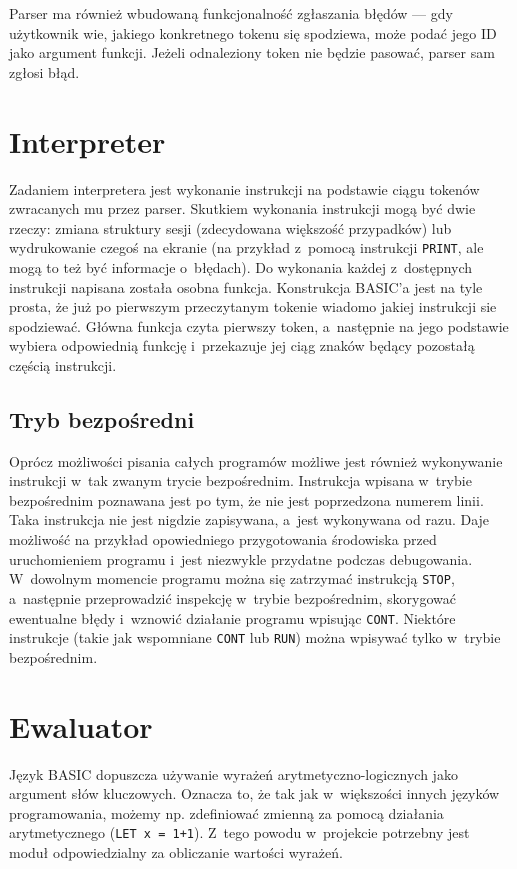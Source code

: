 \documentclass[shortabstract]{iithesis}
\begin{document}
Parser ma również wbudowaną funkcjonalność zgłaszania błędów --- gdy użytkownik wie, jakiego konkretnego tokenu się spodziewa, może podać jego ID jako argument funkcji. Jeżeli odnaleziony token nie będzie pasować, parser sam zgłosi błąd.

\section{Interpreter}
Zadaniem interpretera jest wykonanie instrukcji na podstawie ciągu tokenów zwracanych mu przez parser. Skutkiem wykonania instrukcji mogą być dwie rzeczy: zmiana struktury sesji (zdecydowana większość przypadków) lub wydrukowanie czegoś na ekranie (na przykład z~pomocą instrukcji \texttt{PRINT}, ale mogą to też być informacje o~błędach). Do wykonania każdej z~dostępnych instrukcji napisana została osobna funkcja. Konstrukcja BASIC'a jest na tyle prosta, że już po pierwszym przeczytanym tokenie wiadomo jakiej instrukcji sie spodziewać. Główna funkcja czyta pierwszy token, a~następnie na jego podstawie wybiera odpowiednią funkcję i~przekazuje jej ciąg znaków będący pozostałą częścią instrukcji.
\subsection{Tryb bezpośredni}
Oprócz możliwości pisania całych programów możliwe jest również wykonywanie instrukcji w~tak zwanym trycie bezpośrednim. Instrukcja wpisana w~trybie bezpośrednim poznawana jest po tym, że nie jest poprzedzona numerem linii. Taka instrukcja nie jest nigdzie zapisywana, a~jest wykonywana od razu. Daje możliwość na przykład opowiedniego przygotowania środowiska przed uruchomieniem programu i~jest niezwykle przydatne podczas debugowania. W~dowolnym momencie programu można się zatrzymać instrukcją \texttt{STOP}, a~następnie przeprowadzić inspekcję w~trybie bezpośrednim, skorygować ewentualne błędy i~wznowić działanie programu wpisując \texttt{CONT}. Niektóre instrukcje (takie jak wspomniane \texttt{CONT} lub \texttt{RUN}) można wpisywać tylko w~trybie bezpośrednim.

\section{Ewaluator}
Język BASIC dopuszcza używanie wyrażeń arytmetyczno-logicznych jako argument słów kluczowych. Oznacza to, że tak jak w~większości innych języków programowania, możemy np. zdefiniować zmienną za pomocą działania arytmetycznego (\texttt{LET x = 1+1}). Z~tego powodu w~projekcie potrzebny jest moduł odpowiedzialny za obliczanie wartości wyrażeń.
\end{document}
